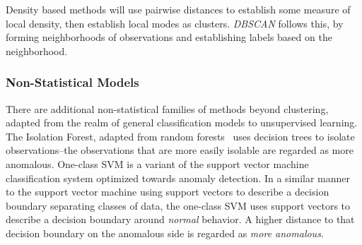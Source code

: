 Density based methods will use pairwise distances to establish some measure of local density, then
    establish local modes as clusters.  \emph{DBSCAN} \citep{ester1996} follows this, by forming
    neighborhoods of observations and establishing labels based on the neighborhood.

\subsubsection{Non-Statistical Models}
There are additional non-statistical families of methods beyond clustering, adapted from the realm
    of general classification models to unsupervised learning.  The Isolation Forest,\citep{liu2000}
    adapted from random forests~\citep{breiman2001} uses decision trees to isolate observations--the
    observations that are more easily isolable are regarded as more anomalous.  One-class SVM
    \citep{chang2011} is a variant of the support vector machine classification system optimized towards
    anomaly detection. In a similar manner to the support vector machine using support vectors to
    describe a decision boundary separating classes of data, the one-class SVM uses support vectors to
    describe a decision boundary around \emph{normal} behavior.  A higher distance to that decision
    boundary on the anomalous side is regarded as \emph{more anomalous}.

